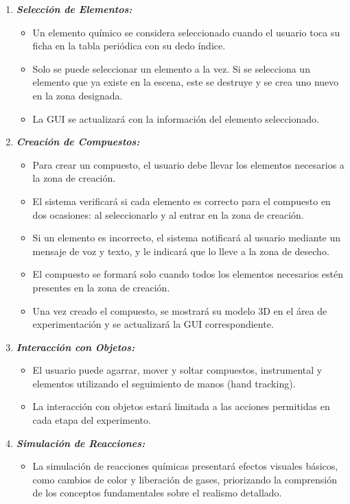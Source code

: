 \begin{enumerate}[{RN-}01. ]
    \item \textit{\textbf{Selección de Elementos: }}
    \begin{itemize}
        \item Un elemento químico se considera seleccionado cuando el usuario toca su ficha en la tabla periódica con su dedo índice. 
        \item Solo se puede seleccionar un elemento a la vez. Si se selecciona un elemento que ya existe en la escena, este se destruye y se crea uno nuevo en la zona designada. 
        \item La GUI se actualizará con la información del elemento seleccionado. 
    \end{itemize}

    \item \textit{\textbf{Creación de Compuestos: }}
    \begin{itemize}
        \item Para crear un compuesto, el usuario debe llevar los elementos necesarios a la zona de creación. 
        \item El sistema verificará si cada elemento es correcto para el compuesto en dos ocasiones: al seleccionarlo y al entrar en la zona de creación. 
        \item Si un elemento es incorrecto, el sistema notificará al usuario mediante un mensaje de voz y texto, y le indicará que lo lleve a la zona de desecho. 
        \item El compuesto se formará solo cuando todos los elementos necesarios estén presentes en la zona de creación. 
        \item Una vez creado el compuesto, se mostrará su modelo 3D en el área de experimentación y se actualizará la GUI correspondiente. 
    \end{itemize}

    \item \textit{\textbf{Interacción con Objetos: }}
    \begin{itemize}
        \item El usuario puede agarrar, mover y soltar compuestos, instrumental y elementos utilizando el seguimiento de manos (hand tracking). 
        \item La interacción con objetos estará limitada a las acciones permitidas en cada etapa del experimento. 
    \end{itemize}

    \item \textit{\textbf{Simulación de Reacciones: }}
    \begin{itemize}
        \item La simulación de reacciones químicas presentará efectos visuales básicos, como cambios de color y liberación de gases, priorizando la comprensión de los conceptos fundamentales sobre el realismo detallado.
    \end{itemize}
    

\end{enumerate}
